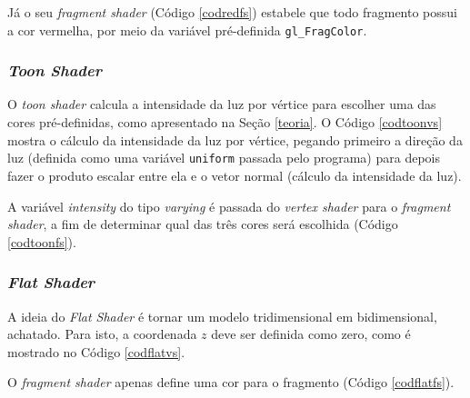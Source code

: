 	

	Já o seu \textit{fragment shader} (Código \ref{codredfs}) estabele que todo fragmento possui a cor vermelha, por meio da variável pré-definida \texttt{gl\_FragColor}.
	
	

\subsubsection{\textit{Toon Shader}}

	O  \textit{toon shader} calcula a intensidade da luz por vértice para escolher uma das cores pré-definidas, como apresentado na Seção \ref{teoria}. O Código  \ref{codtoonvs} mostra o cálculo da intensidade da luz por vértice, pegando primeiro a direção da luz (definida como uma variável \texttt{uniform} passada pelo programa) para depois fazer o produto escalar entre ela e o vetor normal (cálculo da intensidade da luz).  

	

	A variável \textit{intensity} do tipo \textit{varying} é passada do \textit{vertex shader} para o \textit{fragment shader}, a fim de determinar qual das três cores será escolhida (Código \ref{codtoonfs}). 
  
 	

\subsubsection{\textit{Flat Shader}}

	A ideia do \textit{Flat Shader} é tornar um modelo tridimensional em bidimensional, achatado. Para isto, a coordenada $z$ deve ser definida como zero, como é mostrado no Código \ref{codflatvs}.

	

	O \textit{fragment shader} apenas define uma cor para o fragmento (Código \ref{codflatfs}).

